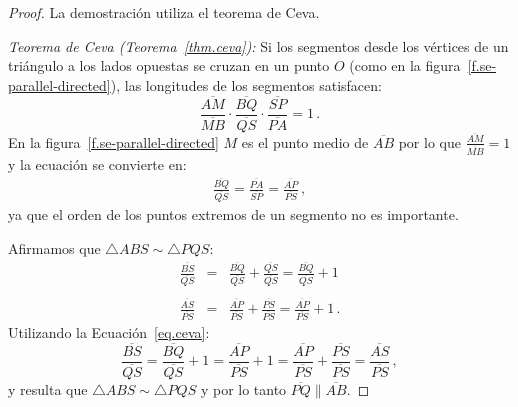\begin{proof}
La demostración utiliza el teorema de Ceva.

\textit{Teorema de Ceva  (Teorema~\ref{thm.ceva}):}
Si los segmentos desde los vértices de un triángulo a los lados opuestas se cruzan en un punto $O$ (como en la figura~\ref{f.se-parallel-directed}), las longitudes de los segmentos satisfacen:
\[
\frac{\overline{AM}}{\overline{MB}}\cdot\frac{\overline{BQ}}{\overline{QS}}\cdot\frac{\overline{SP}}{\overline{PA}} = 1\,.
\]
En la figura~\ref{f.se-parallel-directed} $M$ es el punto medio de $\overline{AB}$ por lo que $\displaystyle\frac{\overline{AM}}{\overline{MB}}=1$ y la ecuación se convierte en:
\begin{align}
\frac{\overline{BQ}}{\overline{QS}}=\frac{\overline{PA}}{\overline{SP}}=\frac{\overline{AP}}{\overline{PS}}\,,\label{eq.ceva}
\end{align}
ya que el orden de los puntos extremos de un segmento no es importante.

Afirmamos que $\triangle ABS \sim \triangle PQS$:
\begin{eqnarray*}
\frac{\overline{BS}}{\overline{QS}}&=&\frac{\overline{BQ}}{\overline{QS}}+\frac{\overline{QS}}{\overline{QS}} = \frac{\overline{BQ}}{\overline{QS}}+1\\
&&\\
\frac{\overline{AS}}{\overline{PS}} &=& \frac{\overline{AP}}{\overline{PS}} + \frac{\overline{PS}}{\overline{PS}} = \frac{\overline{AP}}{\overline{PS}} + 1\,.
\end{eqnarray*}
Utilizando la Ecuación~\ref{eq.ceva}:
\[
\frac{\overline{BS}}{\overline{QS}}=\frac{\overline{BQ}}{\overline{QS}}+1=\frac{\overline{AP}}{\overline{PS}}+1=\frac{\overline{AP}}{\overline{PS}}+\frac{\overline{PS}}{\overline{PS}}=\frac{\overline{AS}}{\overline{PS}}\,,
\]
y resulta que $\triangle ABS \sim \triangle PQS$ y por lo tanto $\overline{PQ}\parallel\overline{AB}$.


\end{proof}
